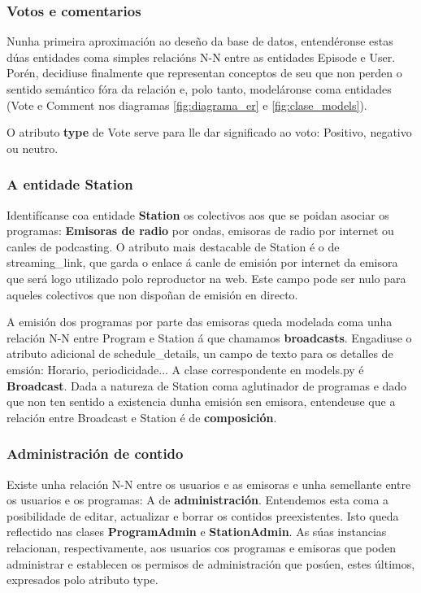 \subsubsection{Votos e comentarios}

Nunha primeira aproximación ao deseño da base de datos, entendéronse estas dúas entidades coma simples relacións N-N entre as entidades Episode e User. Porén, decidiuse finalmente que representan conceptos de seu que non perden o sentido semántico fóra da relación e, polo tanto, modeláronse coma entidades (Vote e Comment nos diagramas \ref{fig:diagrama_er} e \ref{fig:clase_models}).

O atributo \textbf{type} de Vote serve para lle dar significado ao voto: Positivo, negativo ou neutro.


\subsubsection{A entidade Station}

Identifícanse coa entidade \textbf{Station} os colectivos aos que se poidan asociar os programas: \textbf{Emisoras de radio} por ondas, emisoras de radio por internet ou canles de podcasting. O atributo mais destacable de Station é o de streaming\_link, que garda o enlace á canle de emisión por internet da emisora que será logo utilizado polo reproductor na web. Este campo pode ser nulo para aqueles colectivos que non dispoñan de emisión en directo.  

A emisión dos programas por parte das emisoras queda modelada coma unha relación N-N entre Program e Station á que chamamos \textbf{broadcasts}. Engadiuse o atributo adicional de schedule\_details, un campo de texto para os detalles de emsión: Horario, periodicidade... A clase correspondente en models.py é \textbf{Broadcast}. Dada a natureza de Station coma aglutinador de programas e dado que non ten sentido a existencia dunha emisión sen emisora, entendeuse que a relación entre Broadcast e Station é de \textbf{composición}. 


\subsubsection{Administración de contido}

Existe unha relación N-N entre os usuarios e as emisoras e unha semellante entre os usuarios e os programas: A de \textbf{administración}. Entendemos esta coma a posibilidade de editar, actualizar e borrar os contidos preexistentes. Isto queda reflectido nas clases \textbf{ProgramAdmin} e \textbf{StationAdmin}. As súas instancias relacionan, respectivamente, aos usuarios cos programas e emisoras que poden administrar e establecen os permisos de administración que posúen, estes últimos, expresados polo atributo type.

